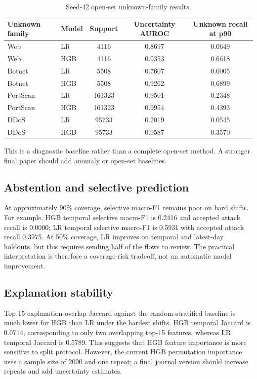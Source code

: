 \documentclass[11pt,a4paper]{article}
\begin{document}
\begin{table}[ht]
\centering
\caption{Seed-42 open-set unknown-family results.}
\label{tab:openset}
\begin{tabular}{llccc}
\toprule
Unknown family & Model & Support & Uncertainty AUROC & Unknown recall at p90 \\
\midrule
Web & LR & 4116 & 0.8697 & 0.0649 \\
Web & HGB & 4116 & 0.9353 & 0.6618 \\
Botnet & LR & 5508 & 0.7607 & 0.0005 \\
Botnet & HGB & 5508 & 0.9262 & 0.6899 \\
PortScan & LR & 161323 & 0.9501 & 0.2348 \\
PortScan & HGB & 161323 & 0.9954 & 0.4393 \\
DDoS & LR & 95733 & 0.2019 & 0.0545 \\
DDoS & HGB & 95733 & 0.9587 & 0.3570 \\
\bottomrule
\end{tabular}
\end{table}

This is a diagnostic baseline rather than a complete open-set method. A stronger final paper should add anomaly or open-set baselines.

\subsection{Abstention and selective prediction}

At approximately 90\% coverage, selective macro-F1 remains poor on hard shifts. For example, HGB temporal selective macro-F1 is 0.2416 and accepted attack recall is 0.0000; LR temporal selective macro-F1 is 0.5931 with accepted attack recall 0.3975. At 50\% coverage, LR improves on temporal and latest-day holdouts, but this requires sending half of the flows to review. The practical interpretation is therefore a coverage-risk tradeoff, not an automatic model improvement.

\subsection{Explanation stability}

Top-15 explanation-overlap Jaccard against the random-stratified baseline is much lower for HGB than LR under the hardest shifts. HGB temporal Jaccard is 0.0714, corresponding to only two overlapping top-15 features, whereas LR temporal Jaccard is 0.5789. This suggests that HGB feature importance is more sensitive to split protocol. However, the current HGB permutation importance uses a sample size of 2000 and one repeat; a final journal version should increase repeats and add uncertainty estimates.
\end{document}
